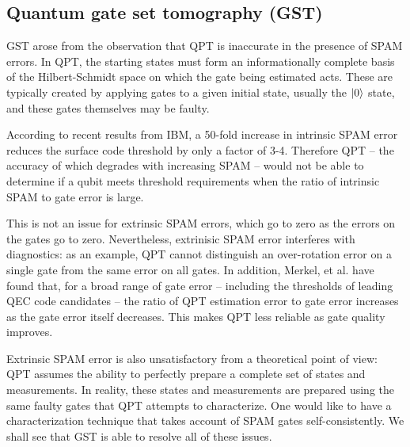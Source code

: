 \documentclass[11pt, oneside]{article}   	%
\begin{document}
\subsection{Quantum gate set tomography (GST)}

GST arose from the observation that QPT is inaccurate in the presence of SPAM errors. 
In QPT, the starting states must form an informationally complete basis of the Hilbert-Schmidt space on which the gate being estimated acts. 
These are typically created by applying gates to a given initial state, usually the $\ket{0}$ state, and these gates themselves may be faulty.

According to recent results from IBM, a 50-fold increase in intrinsic SPAM error reduces the surface code threshold by only a factor of 3-4. 
Therefore QPT -- the accuracy of which degrades with increasing SPAM -- would not be able to determine if a qubit meets threshold requirements when the ratio of intrinsic SPAM to gate error is large.

This is not an issue for extrinsic SPAM errors, which go to zero as the errors on the gates go to zero. 
Nevertheless, extrinisic SPAM error interferes with diagnostics: as an example, QPT cannot distinguish an over-rotation error on a single gate from the same error on all gates. 
In addition, Merkel, et al. have found that, for a broad range of gate error -- including the thresholds of leading QEC code candidates -- the ratio of QPT estimation error to gate error increases as the gate error itself decreases. 
This makes QPT less reliable as gate quality improves.

Extrinsic SPAM error is also unsatisfactory from a theoretical point of view: QPT assumes the ability to perfectly prepare a complete set of states and measurements. 
In reality, these states and measurements are prepared using the same faulty gates that QPT attempts to characterize. 
One would like to have a characterization technique that takes account of SPAM gates self-consistently. 
We shall see that GST is able to resolve all of these issues.
\end{document}
